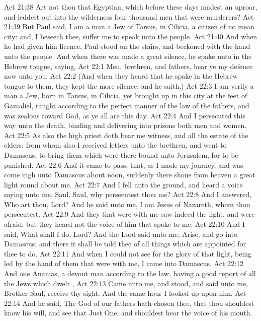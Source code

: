 \vs Act 21:38 Art not thou that Egyptian, which before these days madest an uproar, and leddest out into the wilderness four thousand men that were murderers?
\vs Act 21:39 But Paul said, I am a man  a Jew of Tarsus,  in Cilicia, a citizen of no mean city: and, I beseech thee, suffer me to speak unto the people.
\vs Act 21:40 And when he had given him licence, Paul stood on the stairs, and beckoned with the hand unto the people. And when there was made a great silence, he spake unto  in the Hebrew tongue, saying,
\vs Act 22:1 Men, brethren, and fathers, hear ye my defence  now unto you.
\vs Act 22:2 (And when they heard that he spake in the Hebrew tongue to them, they kept the more silence: and he saith,)
\vs Act 22:3 I am verily a man  a Jew, born in Tarsus,  in Cilicia, yet brought up in this city at the feet of Gamaliel,  taught according to the perfect manner of the law of the fathers, and was zealous toward God, as ye all are this day.
\vs Act 22:4 And I persecuted this way unto the death, binding and delivering into prisons both men and women.
\vs Act 22:5 As also the high priest doth bear me witness, and all the estate of the elders: from whom also I received letters unto the brethren, and went to Damascus, to bring them which were there bound unto Jerusalem, for to be punished.
\vs Act 22:6 And it came to pass, that, as I made my journey, and was come nigh unto Damascus about noon, suddenly there shone from heaven a great light round about me.
\vs Act 22:7 And I fell unto the ground, and heard a voice saying unto me, Saul, Saul, why persecutest thou me?
\vs Act 22:8 And I answered, Who art thou, Lord? And he said unto me, I am Jesus of Nazareth, whom thou persecutest.
\vs Act 22:9 And they that were with me saw indeed the light, and were afraid; but they heard not the voice of him that spake to me.
\vs Act 22:10 And I said, What shall I do, Lord? And the Lord said unto me, Arise, and go into Damascus; and there it shall be told thee of all things which are appointed for thee to do.
\vs Act 22:11 And when I could not see for the glory of that light, being led by the hand of them that were with me, I came into Damascus.
\vs Act 22:12 And one Ananias, a devout man according to the law, having a good report of all the Jews which dwelt ,
\vs Act 22:13 Came unto me, and stood, and said unto me, Brother Saul, receive thy sight. And the same hour I looked up upon him.
\vs Act 22:14 And he said, The God of our fathers hath chosen thee, that thou shouldest know his will, and see that Just One, and shouldest hear the voice of his mouth.
